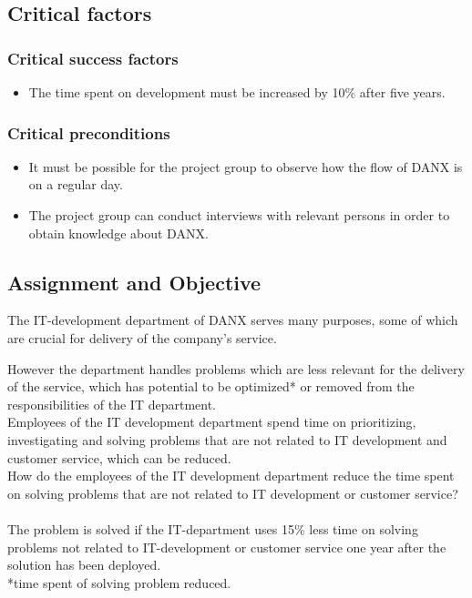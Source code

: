 \subsection{Critical factors}
\subsubsection{Critical success factors}
\begin{itemize}
	\item The time spent on development must be increased by 10\% after five years.
\end{itemize}

\subsubsection{Critical preconditions}
\begin{itemize}
	\item It must be possible for the project group to observe how the flow of DANX is on a regular day.
	\item The project group can conduct interviews with relevant persons in order to obtain knowledge about DANX.
\end{itemize}

\subsection{Assignment and Objective}
The IT-development department of DANX serves many purposes, some of which are crucial for delivery of the company’s service.

However the department handles problems which are less relevant for the delivery of the service, which has potential to be optimized* or removed from the responsibilities of the IT department. \\

Employees of the IT development department spend time on prioritizing, investigating and solving problems that are not related to IT development and customer service, which can be reduced. \\

How do the employees of the IT development department reduce the time spent on solving problems that are not related to IT development or customer service?
\\ \\
The problem is solved if the IT-department uses 15\% less time on solving problems not related to IT-development or customer service one year after the solution has been deployed.
\\
\small{*time spent of solving problem reduced.}\\

